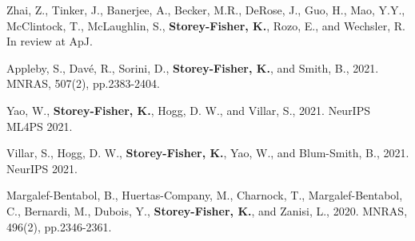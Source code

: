 \item[\arXiv{2203.08999}] Zhai, Z., Tinker, J., Banerjee, A., Becker, M.R., DeRose, J., Guo, H., Mao, Y.Y., McClintock, T., McLaughlin, S., \textbf{Storey-Fisher, K.}, Rozo, E., and Wechsler, R.  In review at ApJ.
\item[\arXiv{2102.10126}] Appleby, S., Davé, R., Sorini, D., \textbf{Storey-Fisher, K.}, and Smith, B., 2021.  MNRAS, 507(2), pp.2383-2404. 
\item[\arXiv{2110.03761}] Yao, W., \textbf{Storey-Fisher, K.}, Hogg, D. W., and Villar, S., 2021.  NeurIPS ML4PS 2021. 
\item[\arXiv{2106.06610}] Villar, S., Hogg, D. W., \textbf{Storey-Fisher, K.}, Yao, W., and Blum-Smith, B., 2021.  NeurIPS 2021.
\item[\arXiv{2003.08263}] Margalef-Bentabol, B., Huertas-Company, M., Charnock, T., Margalef-Bentabol, C., Bernardi, M., Dubois, Y., \textbf{Storey-Fisher, K.}, and Zanisi, L., 2020.  MNRAS, 496(2), pp.2346-2361.